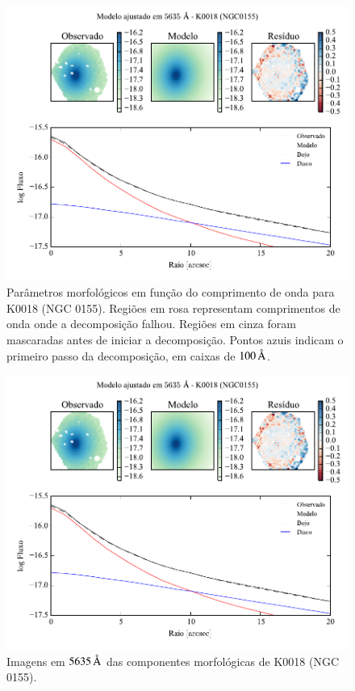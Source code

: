 \begin{figure}
	\includegraphics[page=2]{figuras-decomp/K0018_sample006a}
	\caption[Parâmetros morfológicos em função do comprimento de onda de K0018
	(NGC 0155)]
	{Parâmetros morfológicos em função do comprimento de onda para
	K0018 (NGC 0155). Regiões em rosa representam comprimentos de onda onde a
	decomposição falhou. Regiões em cinza foram mascaradas antes de iniciar a
	decomposição. Pontos azuis indicam o primeiro passo da decomposição, em caixas
	de $100\,\text{\normalfont\AA}$.}
	\label{fig:decompParams:K0018}
\end{figure}

\begin{figure}
	\includegraphics[page=3]{figuras-decomp/K0018_sample006a}
	\caption[Imagens em $5635\,\angstrom$ das componentes morfológicas de K0018
	(NGC 0155)]
	{Imagens em $5635\,\angstrom$ das componentes morfológicas de K0018
	(NGC 0155).}
	\label{fig:decompImages:K0018}
\end{figure}


